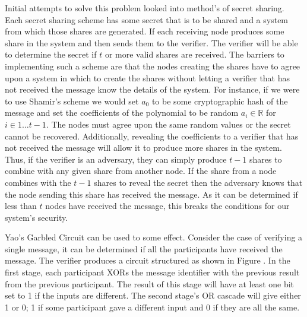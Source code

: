 \documentclass[ %
                    author={Luke Murray},
                supervisor={Dr. Simon Hollis},
                     title={Shadow Peer-to-Peer Networks},
                  subtitle={},
                    degree={MEng},
                      year={2013} ]{thesis}
\begin{document}
Initial attempts to solve this problem looked into method's of secret sharing. Each secret sharing scheme has some secret that is to be shared and a system from which those shares are generated. If each receiving node produces some share in the system and then sends them to the verifier. The verifier will be able to determine the secret if $t$ or more valid shares are received. The barriers to implementing such a scheme are that the nodes creating the shares have to agree upon a system in which to create the shares without letting a verifier that has not received the message know the details of the system. For instance, if we were to use Shamir's scheme\cite{Shamir} we would set $a_0$ to be some cryptographic hash of the message and set the coefficients of the polynomial to be random $a_i \in \mathbb{R}$ for $i \in {1 \ldots t-1}$. The nodes must agree upon the same random values or the secret cannot be recovered. Additionally, revealing the coefficients to a verifier that has not received the message will allow it to produce more shares in the system. Thus, if the verifier is an adversary, they can simply produce $t-1$ shares to combine with any given share from another node. If the share from a node combines with the $t-1$ shares to reveal the secret then the adversary knows that the node sending this share has received the message. As it can be determined if less than $t$ nodes have received the message, this breaks the conditions for our system's security.

Yao's Garbled Circuit can be used to some effect. Consider the case of verifying a single message, it can be determined if all the participants have received the message. The verifier produces a circuit structured as shown in Figure \cite{yao}. In the first stage, each participant XORs the message identifier with the previous result from the previous participant. The result of this stage will have at least one bit set to 1 if the inputs are different. The second stage's OR cascade will give either 1 or 0; 1 if some participant gave a different input and 0 if they are all the same.
\end{document}
